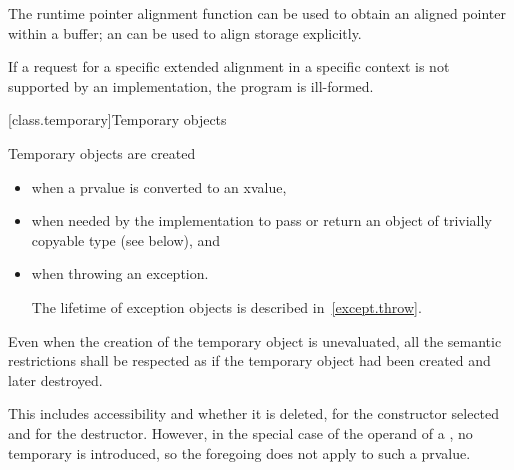 \pnum
\begin{note}
The runtime pointer alignment function
can be used to obtain an aligned pointer within a buffer;
an 
can be used to align storage explicitly.
\end{note}

\pnum
If a request for a specific extended alignment in a specific context is not
supported by an implementation, the program is ill-formed.

[class.temporary]{Temporary objects}

\pnum
{}%
%
%
%
%
Temporary objects are created
\begin{itemize}
\item
when a prvalue is converted to an xvalue,
\item
when needed by the implementation to pass or return an object of trivially copyable type (see below),
and
\item
when throwing an exception.
\begin{note}
The lifetime of exception objects is described in~\ref{except.throw}.
\end{note}
\end{itemize}
Even when the creation of the temporary object is
unevaluated,
all the semantic restrictions shall be respected as if the temporary object
had been created and later destroyed.
\begin{note}
This includes accessibility and whether it is deleted,
for the constructor selected and for the destructor. However, in the special
case of the operand of a
, no temporary is introduced,
so the foregoing does not apply to such a prvalue.
\end{note}

